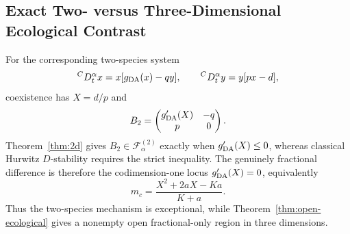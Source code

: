 \subsection{Exact Two- versus Three-Dimensional Ecological Contrast}

For the corresponding two-species system
\[
 {}^CD_t^\alpha x=x[g_{\rm DA}(x)-qy],
 \qquad
 {}^CD_t^\alpha y=y[px-d],
\]
coexistence has \(X=d/p\) and
\[
 B_2=
 \begin{pmatrix}
 g_{\rm DA}'(X)&-q\\
 p&0
 \end{pmatrix}.
\]
Theorem~\ref{thm:2d} gives \(B_2\in\mathcal F_\alpha^{(2)}\) exactly when \(g_{\rm DA}'(X)\le0\), whereas classical Hurwitz \(D\)-stability requires the strict inequality. The genuinely fractional difference is therefore the codimension-one locus \(g_{\rm DA}'(X)=0\), equivalently
\begin{equation}
 m_c=\frac{X^2+2aX-Ka}{K+a}.
 \label{eq:mc-2d}
\end{equation}
Thus the two-species mechanism is exceptional, while Theorem~\ref{thm:open-ecological} gives a nonempty open fractional-only region in three dimensions.
